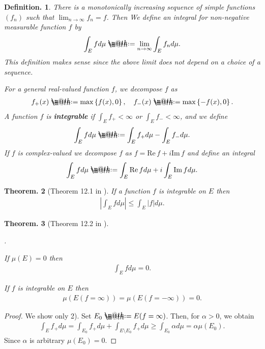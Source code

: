 \documentclass[openany, a4paper, oneside]{jsbook}
\makeatletter
\newcounter{enum2}
\renewenvironment{enumerate}{%
\begin{list}%
{%
\arabic{enum2}.\ \,%
}%
{%
\usecounter{enum2}
\setlength{\itemindent}{0pt}%
\setlength{\leftmargin}{15pt}%
\setlength{\rightmargin}{0pt}%
\setlength{\labelsep}{0pt}%
\setlength{\labelwidth}{6pt}%
\setlength{\itemsep}{0pt}%
\setlength{\parsep}{0pt}%
\setlength{\listparindent}{0pt}%
}
}{%
\end{list}%
}
\newcommand*{\defeq}{\mathrel{\rlap{%
\raisebox{0.3ex}{$\m@th\cdot$}}%
\raisebox{-0.3ex}{$\m@th\cdot$}}%
=}
\theoremstyle{break}
\theoremstyle{breakdefn}
\newtheorem{thm}{Theorem.}[section]
\newtheorem{defn}[thm]{Definition.}
\renewcommand{\Im}{\mathrm{Im} \,}
\renewcommand{\Re}{\mathrm{Re} \,}
\newcommand{\abs}[1]{\left|#1\right|}
\newcommand{\cbk}[1]{\left\{#1\right\}}
\newcommand{\upbf}[1]{\textup{\textbf{#1}}}
\makeatother
\begin{document}
\begin{defn}
 There is a monotonically increasing sequence of simple functions $(f_n)$ such that $\lim_{n \to \infty} f_n = f$.
 Then  We define an integral for non-negative measurable function $f$ by
 \begin{align}
  \int_E f d \mu
  \defeq
  \lim_{n \to \infty} \int_E f_n d \mu.
 \end{align}
 This definition makes sense since the above limit does not depend on a choice of a sequence.

 For a general real-valued function $f$, we decompose $f$ as
 \begin{align}
  f_+ (x)
  \defeq
  \max \cbk{f (x), 0}, \quad
  f_- (x)
  \defeq
  \max \cbk{- f (x), 0}.
 \end{align}
 A function $f$ is \upbf{integrable} if $\int_E f_+ < \infty$ or $\int_E f_- < \infty$, and we define
 \begin{align}
  \int_E f d \mu
  \defeq
  \int_E f_+ d \mu - \int_E f_- d \mu.
 \end{align}
 If $f$ is complex-valued we decompose $f$ as $f = \Re f + i \Im f$ and define an integral
 \begin{align}
  \int_E f d\mu
  \defeq
  \int_E \Re f d \mu + i \int_E \Im f d \mu.
 \end{align}
\end{defn}
\begin{thm}[Theorem 12.1 in \cite{SeizoIto1}]
 If a function $f$ is integrable on $E$ then
 \begin{align}
  \abs{\int_E f d\mu}
  \leq
  \int_E \abs{f} d\mu.
 \end{align}
\end{thm}
\begin{thm}[Theorem 12.2 in \cite{SeizoIto1}]
\begin{enumerate}
\item If $\mu (E) = 0$ then
    \begin{align}
     \int_E f d \mu = 0.
    \end{align}
\item If $f$ is integrable on $E$ then
    \begin{align}
     \mu (E (f = \infty)) = \mu (E (f = - \infty)) = 0.
    \end{align}
\end{enumerate}
\end{thm}
\begin{proof}
We show only 2).
Set $E_0 \defeq E (f = \infty)$.
Then, for $\alpha > 0$, we obtain
\begin{align}
 \int_E f_+ d \mu
 =
 \int_{E_0} f_+ d \mu + \int_{E \setminus E_0} f_+ d \mu
 \geq
 \int_{E_0} \alpha d \mu
 =
 \alpha \mu (E_0).
\end{align}
Since $\alpha$ is arbitrary $\mu (E_0) = 0$.
\end{proof}
\end{document}
